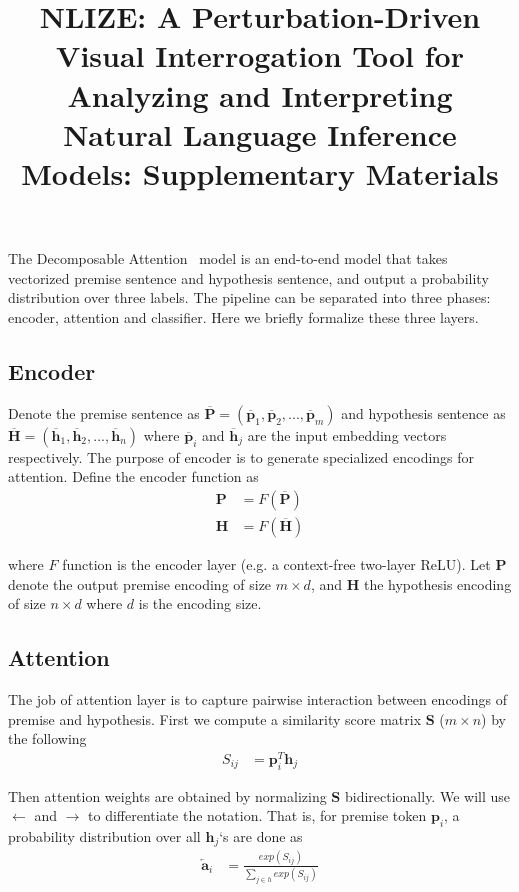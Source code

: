 \documentclass[review,journal]{vgtc}         %
\title{
NLIZE: A Perturbation-Driven Visual Interrogation Tool for Analyzing and Interpreting Natural Language Inference Models: Supplementary Materials
}
\begin{document}
\maketitle

The Decomposable Attention~\cite{parikh2016emnlp} model is an end-to-end model that takes vectorized premise sentence and hypothesis sentence, and output a probability distribution over three labels. The pipeline can be separated into three phases: encoder, attention and classifier. Here we briefly formalize these three layers.

\subsection{Encoder}
Denote the premise sentence as $\overline{\boldsymbol{P}} = (\overline{\boldsymbol{p}}_1, \overline{\boldsymbol{p}}_2, ..., \overline{\boldsymbol{p}}_m)$ and hypothesis sentence as $\overline{\boldsymbol{H}} = (\overline{\boldsymbol{h}}_1, \overline{\boldsymbol{h}}_2, ..., \overline{\boldsymbol{h}}_n)$ where $\overline{\boldsymbol{p}}_i$ and $\overline{\boldsymbol{h}}_j$ are the input embedding vectors respectively. The purpose of encoder is to generate specialized encodings for attention. Define the encoder function as
\begin{align}
  \boldsymbol{P} &= F(\overline{\boldsymbol{P}})\\
  \boldsymbol{H} &= F(\overline{\boldsymbol{H}})
\end{align}

where $F$ function is the encoder layer (e.g. a context-free two-layer ReLU). Let $\boldsymbol{P}$ denote the output premise encoding of size $m \times d$, and $\boldsymbol{H}$ the hypothesis encoding of size $n \times d$ where $d$ is the encoding size.

\subsection{Attention} \label{sec:att}
The job of attention layer is to capture pairwise interaction between encodings of premise and hypothesis. First we compute a similarity score matrix $\boldsymbol{S}$ ($m \times n$) by the following
\begin{align}
  S_{ij} &= \boldsymbol{p}_i ^T \boldsymbol{h}_j
\end{align}

Then attention weights are obtained by normalizing $\boldsymbol{S}$ bidirectionally. We will use $\leftarrow$ and $\rightarrow$ to differentiate the notation. That is, for premise token $\boldsymbol{p}_i$, a probability distribution over all $\boldsymbol{h}_j$`s are done as
\begin{align}
  \overleftarrow{\boldsymbol{a}}_i &= \frac{exp(S_{ij})}{\sum_{j \in h} exp(S_{ij})}
\end{align}
\end{document}
